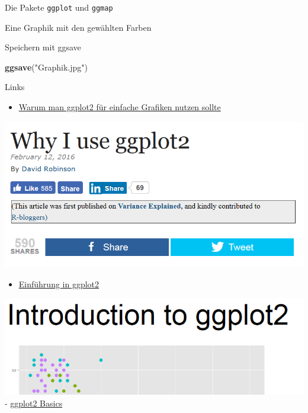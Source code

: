 \documentclass[ignorenonframetext,]{beamer}
\newenvironment{Shaded}{}{}
\newcommand{\KeywordTok}[1]{\textcolor[rgb]{0.00,0.44,0.13}{\textbf{{#1}}}}
\newcommand{\StringTok}[1]{\textcolor[rgb]{0.25,0.44,0.63}{{#1}}}
\newcommand{\NormalTok}[1]{{#1}}
\providecommand{\tightlist}{%
\setlength{\itemsep}{0pt}\setlength{\parskip}{0pt}}
\begin{document}
\begin{frame}[fragile]{Die Pakete \texttt{ggplot} und \texttt{ggmap}}
\begin{block}{Eine Graphik mit den gewählten Farben}
\end{block}

\begin{block}{Speichern mit ggsave}

\begin{Shaded}
\begin{Highlighting}[]
\KeywordTok{ggsave}\NormalTok{(}\StringTok{"Graphik.jpg"}\NormalTok{)}
\end{Highlighting}
\end{Shaded}

\end{block}

\begin{block}{Links}

\begin{itemize}
\tightlist
\item
  \href{http://www.r-bloggers.com/why-i-use-ggplot2/}{Warum man ggplot2
  für einfache Grafiken nutzen sollte}
\end{itemize}

\includegraphics{./tex2pdf.9796/713676ac3cd032e94fe59b2c8c1b24589dad7ad2.png}

\begin{itemize}
\tightlist
\item
  \href{https://opr.princeton.edu/workshops/Downloads/2015Jan_ggplot2Koffman.pdf}{Einführung
  in ggplot2}
\end{itemize}

\includegraphics{./tex2pdf.9796/46d059842565736d008f8e7cd97de8d090f2398c.png}
-
\href{http://tutorials.iq.harvard.edu/R/Rgraphics/Rgraphics.html}{ggplot2
Basics}


\end{block}
\end{frame}
\end{document}
